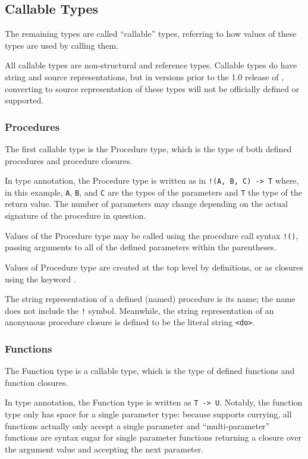 \subsection{Callable Types}

The remaining types are called ``callable'' types, referring to how values of these
types are used by calling them.

All callable types are non-structural and reference types. Callable types do
have string and source representations, but in versions prior to the 1.0
release of \Trilogy{}, converting to source representation of these types will
not be officially defined or supported.

\subsubsection{Procedures}

The first callable type is the Procedure type, which is the type of both
defined procedures and procedure closures.

In type annotation, the Procedure type is written as in \texttt{!(A, B, C) -> T}
where, in this example, \texttt{A}, \texttt{B}, and \texttt{C} are the types of
the parameters and \texttt{T} the type of the return value. The number of parameters
may change depending on the actual signature of the procedure in question.

Values of the Procedure type may be called using the procedure call syntax \texttt{!()},
passing arguments to all of the defined parameters within the parentheses.

Values of Procedure type are created at the top level by  definitions, or as
closures using the keyword .

The string representation of a defined (named) procedure is its name; the name does
not include the \texttt{!} symbol. Meanwhile, the string representation of an anonymous
procedure closure is defined to be the literal string \texttt{<do>}.

\subsubsection{Functions}

The Function type is a callable type, which is the type of defined functions and
function closures.

In type annotation, the Function type is written as \texttt{T -> U}. Notably, the
function type only has space for a single parameter type: because \Poetry{} supports
currying, all functions actually only accept a single parameter and ``multi-parameter''
functions are syntax sugar for single parameter functions returning a closure over
the argument value and accepting the next parameter.

